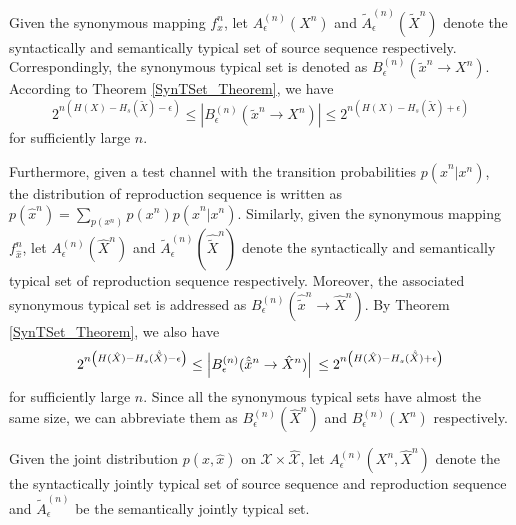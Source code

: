 \documentclass[12pt, draftclsnofoot,onecolumn]{IEEEtran}
\begin{document}
Given the synonymous mapping $f_x^n$, let $A_{\epsilon}^{(n)}(X^n)$ and $\tilde{A}_{\epsilon}^{(n)}(\tilde{X}^n)$ denote the syntactically and semantically typical set of source sequence respectively. Correspondingly, the synonymous typical set is denoted as $B_{\epsilon}^{(n)}(\tilde{x}^n\to X^n)$. According to Theorem \ref{SynTSet_Theorem}, we have
\begin{equation}
 2^{n\left(H(X)-H_s(\tilde{X})-\epsilon\right)}\leq\left|B_{\epsilon}^{(n)}(\tilde{x}^n\to X^n)\right| \leq 2^{n\left(H(X)-H_s(\tilde{X})+\epsilon\right)}
\end{equation}
for sufficiently large $n$.

Furthermore, given a test channel with the transition probabilities $p(\hat{x}^n|x^n)$, the distribution of reproduction sequence is written as $p(\hat{x}^n)=\sum_{p(x^n)}p(x^n)p(\hat{x}^n|x^n)$. Similarly, given the synonymous mapping $f_{\hat{x}}^n$,  let $A_{\epsilon}^{(n)}(\hat{X}^n)$ and $\tilde{A}_{\epsilon}^{(n)}(\hat{\tilde{X}}^n)$ denote the syntactically and semantically typical set of reproduction sequence respectively. Moreover, the associated synonymous typical set is addressed as $B_{\epsilon}^{(n)}(\hat{\tilde{x}}^n\to\hat{X}^n)$. By Theorem \ref{SynTSet_Theorem}, we also have
\begin{equation}
2^{n\left(H(\hat{X})-H_s(\hat{\tilde{X}})-\epsilon\right)} \leq\left|B_{\epsilon}^{(n)}(\hat{\tilde{x}}^n\to\hat{X}^n)\right|\\
 \leq 2^{n\left(H(\hat{X})-H_s(\hat{\tilde{X}})+\epsilon\right)}
\end{equation}
for sufficiently large $n$.
Since all the synonymous typical sets have almost the same size, we can abbreviate them as $B_{\epsilon}^{(n)}(\hat{X}^n)$ and $B_{\epsilon}^{(n)}(X^n)$ respectively.

Given the joint distribution $p(x,\hat{x})$ on $\mathcal{X}\times \hat{\mathcal{X}}$, let $A_{\epsilon}^{(n)}(X^n,\hat{X}^n)$ denote the the syntactically jointly typical set of source sequence and reproduction sequence and $\tilde{A}_{\epsilon}^{(n)}$ be the semantically jointly typical set.
\end{document}
